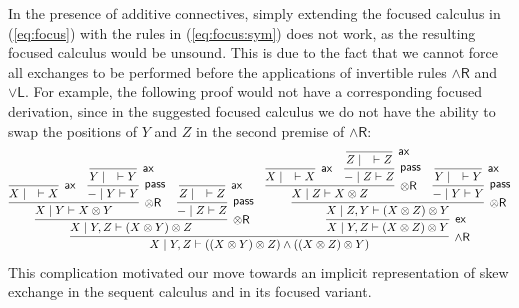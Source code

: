 \documentclass[submission,copyright,creativecommons]{eptcs}
\theoremstyle{definition}
\newcommand{\tr}{\otimes \mathsf{R}}
\newcommand{\pass}{\mathsf{pass}}
\newcommand{\andr}{\land \mathsf{R}}
\newcommand{\orl}{\lor \mathsf{L}}
\newcommand{\ax}{\mathsf{ax}}
\newcommand{\ex}{\mathsf{ex}}
\begin{document}
In the presence of additive connectives, simply extending the focused calculus in (\ref{eq:focus}) with the rules in (\ref{eq:focus:sym}) does not work, as the resulting focused calculus would be unsound. This is due to the fact that we cannot force all exchanges to be performed before the applications of invertible rules $\andr$ and $\orl$. For example, the following proof would not have a corresponding focused derivation, since in the suggested focused calculus we do not have the ability to swap the positions of $Y$ and $Z$ in the second premise of $\andr$:
\[
\infer[\andr]{X \mid Y,Z \vdash ((X \otimes Y) \otimes Z) \land ((X \otimes Z) \otimes Y)}{
  \infer[\tr]{X \mid Y,Z \vdash (X \otimes Y) \otimes Z}{
    \infer[\tr]{X \mid Y \vdash X \otimes Y}{
      \infer[\ax]{X \mid \quad \vdash X}{}
      &
      \infer[\pass]{{-} \mid Y \vdash Y}{
        \infer[\ax]{Y \mid \quad \vdash Y}{}
      }
    }
    &
    \infer[\pass]{{-} \mid Z \vdash Z}{
      \infer[\ax]{Z \mid \quad \vdash Z}{}
    }
  }
  &
  \infer[\ex]{X \mid Y,Z \vdash (X \otimes Z) \otimes Y}{
    \infer[\tr]{X \mid Z,Y \vdash (X \otimes Z) \otimes Y}{
      \infer[\tr]{X \mid Z \vdash X \otimes Z}{
        \infer[\ax]{X \mid \quad \vdash X}{}
        &
        \infer[\pass]{{-} \mid Z \vdash Z}{
          \infer[\ax]{Z \mid \quad \vdash Z}{}
        }
      }
      &
      \infer[\pass]{{-} \mid Y \vdash Y}{
        \infer[\ax]{Y \mid \quad \vdash Y}{}
      }
    }
  }
}
\]
This complication motivated our move towards an implicit representation of skew exchange in the sequent calculus and in its focused variant.
\end{document}
